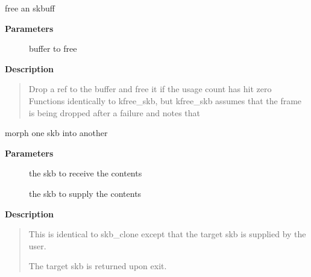\documentclass[a4paper,8pt,english]{sphinxmanual}
\begin{document}
\begin{fulllineitems}
\label{networking/kapi:c.consume_skb}
free an skbuff

\end{fulllineitems}


\textbf{Parameters}
\begin{description}
\item[{}] \leavevmode
buffer to free

\end{description}

\textbf{Description}
\begin{quote}

Drop a ref to the buffer and free it if the usage count has hit zero
Functions identically to kfree\_skb, but kfree\_skb assumes that the frame
is being dropped after a failure and notes that
\end{quote}

\begin{fulllineitems}
\label{networking/kapi:c.skb_morph}
morph one skb into another

\end{fulllineitems}


\textbf{Parameters}
\begin{description}
\item[{}] \leavevmode
the skb to receive the contents

\item[{}] \leavevmode
the skb to supply the contents

\end{description}

\textbf{Description}
\begin{quote}

This is identical to skb\_clone except that the target skb is
supplied by the user.

The target skb is returned upon exit.
\end{quote}
\end{document}

